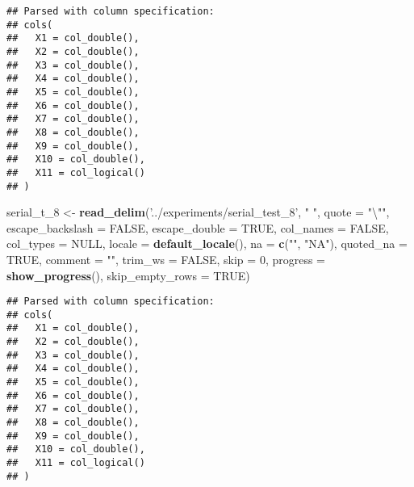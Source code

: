 \documentclass[]{article}
\newenvironment{Shaded}{\begin{snugshade}}{\end{snugshade}}
\newcommand{\KeywordTok}[1]{\textcolor[rgb]{0.13,0.29,0.53}{\textbf{#1}}}
\newcommand{\DataTypeTok}[1]{\textcolor[rgb]{0.13,0.29,0.53}{#1}}
\newcommand{\DecValTok}[1]{\textcolor[rgb]{0.00,0.00,0.81}{#1}}
\newcommand{\CharTok}[1]{\textcolor[rgb]{0.31,0.60,0.02}{#1}}
\newcommand{\StringTok}[1]{\textcolor[rgb]{0.31,0.60,0.02}{#1}}
\newcommand{\OtherTok}[1]{\textcolor[rgb]{0.56,0.35,0.01}{#1}}
\newcommand{\NormalTok}[1]{#1}
\begin{document}
\begin{verbatim}
## Parsed with column specification:
## cols(
##   X1 = col_double(),
##   X2 = col_double(),
##   X3 = col_double(),
##   X4 = col_double(),
##   X5 = col_double(),
##   X6 = col_double(),
##   X7 = col_double(),
##   X8 = col_double(),
##   X9 = col_double(),
##   X10 = col_double(),
##   X11 = col_logical()
## )
\end{verbatim}

\begin{Shaded}
\begin{Highlighting}[]
\NormalTok{serial_t_}\DecValTok{8}\NormalTok{ <-}\StringTok{ }\KeywordTok{read_delim}\NormalTok{(}\StringTok{'../experiments/serial_test_8'}\NormalTok{, }\StringTok{" "}\NormalTok{, }\DataTypeTok{quote =} \StringTok{"}\CharTok{\textbackslash{}"}\StringTok{"}\NormalTok{, }\DataTypeTok{escape_backslash =} \OtherTok{FALSE}\NormalTok{,}
  \DataTypeTok{escape_double =} \OtherTok{TRUE}\NormalTok{, }\DataTypeTok{col_names =} \OtherTok{FALSE}\NormalTok{, }\DataTypeTok{col_types =} \OtherTok{NULL}\NormalTok{,}
  \DataTypeTok{locale =} \KeywordTok{default_locale}\NormalTok{(), }\DataTypeTok{na =} \KeywordTok{c}\NormalTok{(}\StringTok{""}\NormalTok{, }\StringTok{"NA"}\NormalTok{), }\DataTypeTok{quoted_na =} \OtherTok{TRUE}\NormalTok{,}
  \DataTypeTok{comment =} \StringTok{""}\NormalTok{, }\DataTypeTok{trim_ws =} \OtherTok{FALSE}\NormalTok{, }\DataTypeTok{skip =} \DecValTok{0}\NormalTok{, }
 \DataTypeTok{progress =} \KeywordTok{show_progress}\NormalTok{(),}
  \DataTypeTok{skip_empty_rows =} \OtherTok{TRUE}\NormalTok{)}
\end{Highlighting}
\end{Shaded}

\begin{verbatim}
## Parsed with column specification:
## cols(
##   X1 = col_double(),
##   X2 = col_double(),
##   X3 = col_double(),
##   X4 = col_double(),
##   X5 = col_double(),
##   X6 = col_double(),
##   X7 = col_double(),
##   X8 = col_double(),
##   X9 = col_double(),
##   X10 = col_double(),
##   X11 = col_logical()
## )
\end{verbatim}
\end{document}
